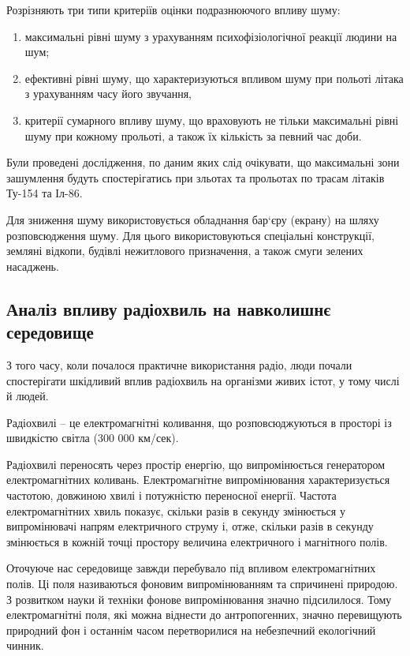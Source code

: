 Розрізняють три типи критеріїв оцінки подразнюючого впливу шуму:
\begin{enumerate}
 \item максимальні рівні шуму з урахуванням психофізіологічної реакції людини на шум;
 \item ефективні рівні шуму, що характеризуються впливом шуму при польоті літака з урахуванням часу його звучання, 
 \item критерії сумарного впливу шуму, що враховують не тільки максимальні рівні шуму при кожному 
прольоті, а також їх кількість за певний час доби.
\end{enumerate}

Були проведені дослідження, по даним яких слід очікувати, що максимальні зони зашумлення будуть 
спостерігатись при зльотах та прольотах по трасам літаків Ту-154 та Іл-86. 

Для зниження шуму використовується обладнання бар`єру (екрану) на шляху розповсюдження шуму. 
Для цього використовуються спеціальні конструкції, земляні відкопи, будівлі нежитлового призначення, а також смуги зелених насаджень.

\subsection{Аналіз впливу радіохвиль на навколишнє середовище}

З того часу, коли почалося практичне використання радіо, люди почали спостерігати шкідливий вплив 
радіохвиль на організми живих істот, у тому числі й людей.

Радіохвилі -- це електромагнітні коливання, що розповсюджуються в просторі із швидкістю світла (300 000 км/сек).

Радіохвилі переносять через простір енергію, що випромінюється генератором електромагнітних коливань. 
Електромагнітне випромінювання характеризується частотою, довжиною хвилі і потужністю переносної енергії. 
Частота електромагнітних хвиль показує, скільки разів в секунду змінюється у випромінювачі напрям електричного 
струму і, отже, скільки разів в секунду змінюється в кожній точці простору величина електричного і магнітного полів.

Оточуюче нас середовище завжди перебувало під впливом електромагнітних полів. Ці поля називаються фоновим 
випромінюванням та спричинені природою. З розвитком науки й техніки фонове випромінювання значно підсилилося. 
Тому електромагнітні поля, які можна віднести до антропогенних, значно перевищують природний фон і останнім 
часом перетворилися на небезпечний екологічний чинник.

